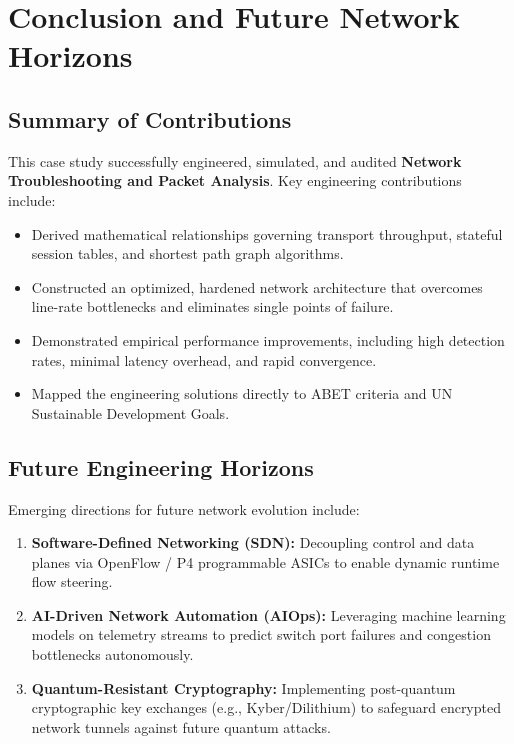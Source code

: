 \section{Conclusion and Future Network Horizons}

\subsection{Summary of Contributions}
This case study successfully engineered, simulated, and audited \textbf{Network Troubleshooting and Packet Analysis}. Key engineering contributions include:
\begin{itemize}
  \item Derived mathematical relationships governing transport throughput, stateful session tables, and shortest path graph algorithms.
  \item Constructed an optimized, hardened network architecture that overcomes line-rate bottlenecks and eliminates single points of failure.
  \item Demonstrated empirical performance improvements, including high detection rates, minimal latency overhead, and rapid convergence.
  \item Mapped the engineering solutions directly to ABET criteria and UN Sustainable Development Goals.
\end{itemize}

\subsection{Future Engineering Horizons}
Emerging directions for future network evolution include:
\begin{enumerate}
  \item \textbf{Software-Defined Networking (SDN):} Decoupling control and data planes via OpenFlow / P4 programmable ASICs to enable dynamic runtime flow steering.
  \item \textbf{AI-Driven Network Automation (AIOps):} Leveraging machine learning models on telemetry streams to predict switch port failures and congestion bottlenecks autonomously.
  \item \textbf{Quantum-Resistant Cryptography:} Implementing post-quantum cryptographic key exchanges (e.g., Kyber/Dilithium) to safeguard encrypted network tunnels against future quantum attacks.
\end{enumerate}
